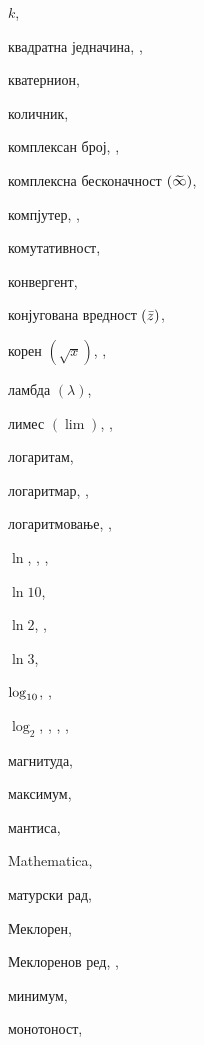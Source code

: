 \begin{theindex}
  \indexspace

  \item $k$, 
  \item квадратна једначина, , 
  \item кватернион, 
  \item количник, 
  \item комплексан број, , 
  \item комплексна бесконачност $({\,\widetilde{\!\infty\!}\,})$, 
  \item компјутер, , 
  \item комутативност, 
  \item конвергент, 
  \item конјугована вредност $({\bar z})$, 
  \item корен $(\sqrt x)$, , 

  \indexspace

  \item ламбда $(\lambda)$, 
  \item лимес $(\lim)$, , 
  \item логаритам, 
  \item логаритмар, , 
  \item логаритмовање, , 
  \indexskip
  \item $\ln$, , , 
  \item $\ln 10$, 
  \item $\ln 2$, , 
  \item $\ln3$, 
  \item $\log_{10}$, , 
  \item $\log_2$, , , , 

  \indexspace

  \item магнитуда, 
  \item максимум, 
  \item мантиса, 
  \item Mathematica, 
  \item матурски рад, 
  \item Меклорен, 
  \item Меклоренов ред, , 
  \item минимум, 
  \item монотоност, 


\end{theindex}
